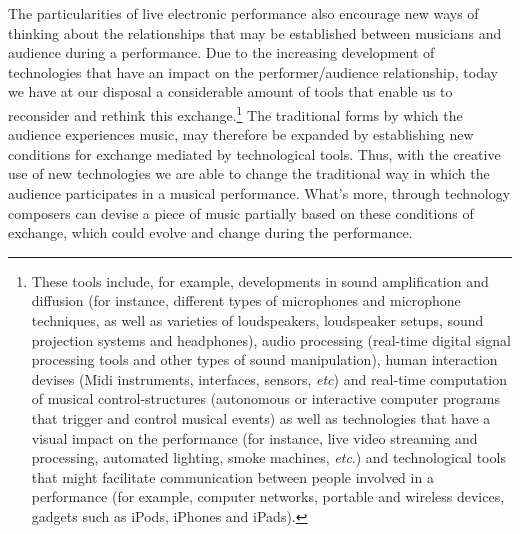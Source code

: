 The particularities of live electronic performance also encourage new ways of thinking about the relationships that may be established between musicians and audience during a performance. Due to the increasing development of technologies that have an impact on the performer/audience relationship, today we have at our disposal a considerable amount of tools that enable us to reconsider and rethink this exchange.\footnote{These tools include, for example, developments in sound amplification and diffusion (for instance, different types of microphones and microphone techniques, as well as varieties of loudspeakers, loudspeaker setups, sound projection systems and headphones), audio processing (real-time digital signal processing tools and other types of sound manipulation), human interaction devises (Midi instruments, interfaces, sensors, \emph{etc}) and real-time computation of musical control-structures (autonomous or interactive computer programs that trigger and control musical events) as well as technologies that have a visual impact on the performance (for instance, live video streaming and processing, automated lighting, smoke machines, \emph{etc}.) and technological tools that might facilitate communication between people involved in a performance (for example, computer networks, portable and wireless devices, gadgets such as iPods, iPhones and iPads).} The traditional forms by which the audience experiences music, may therefore be expanded by establishing new conditions for exchange mediated by technological tools. Thus, with the creative use of new technologies we are able to change the traditional way in which the audience participates in a musical performance. What's more, through technology composers can devise a piece of music partially based on these conditions of exchange, which could evolve and change during the performance. 

